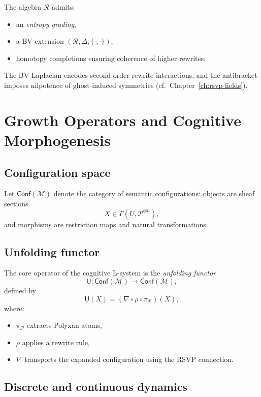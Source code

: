 The algebra $\mathcal{R}$ admits:
\begin{itemize}
  \item an \emph{entropy grading},
  \item a BV extension $(\mathcal{R},\Delta,\{\cdot,\cdot\})$,
  \item homotopy completions ensuring coherence of higher rewrites.
\end{itemize}

The BV Laplacian encodes second-order rewrite interactions, and the antibracket
imposes nilpotence of ghost-induced symmetries (cf.\ Chapter~\ref{ch:rsvp-fields}).

\section{Growth Operators and Cognitive Morphogenesis}

\subsection{Configuration space}

Let $\mathsf{Conf}(\mathcal{M})$ denote the category of semantic configurations:
objects are sheaf sections
\[
X \in \Gamma(U, \mathscr{P}^{\otimes n}),
\]
and morphisms are restriction maps and natural transformations.

\subsection{Unfolding functor}

The core operator of the cognitive L-system is the \emph{unfolding functor}
\[
\mathsf{U} : \mathsf{Conf}(\mathcal{M}) \longrightarrow \mathsf{Conf}(\mathcal{M}),
\]
defined by
\[
\mathsf{U}(X)
= 
(\nabla \circ \rho \circ \pi_{\mathscr{P}})(X),
\]
where:
\begin{itemize}
  \item $\pi_{\mathscr{P}}$ extracts Polyxan atoms,
  \item $\rho$ applies a rewrite rule,
  \item $\nabla$ transports the expanded configuration using the RSVP connection.
\end{itemize}

\subsection{Discrete and continuous dynamics}

